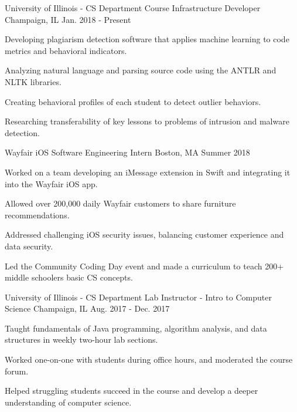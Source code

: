 
\begin{cventries}
\cventry
{University of Illinois - CS Department} %
{Course Infrastructure Developer} %
{Champaign, IL} %
{Jan. 2018 - Present} %
{
	\begin{cvitems} %
		\item {Developing plagiarism detection software that applies machine learning to code metrics and behavioral indicators.}
		\item {Analyzing natural language and parsing source code using the ANTLR and NLTK libraries.}
		\item {Creating behavioral profiles of each student to detect outlier behaviors.}
		\item {Researching transferability of key lessons to problems of intrusion and malware detection.}
	\end{cvitems}
}
\cventry
{Wayfair} %
{iOS Software Engineering Intern} %
{Boston, MA} %
{Summer 2018} %
{
	\begin{cvitems} %
		\item {Worked on a team developing an iMessage extension in Swift and integrating it into the Wayfair iOS app.}
		\item {Allowed over 200,000 daily Wayfair customers to share furniture recommendations.}
		\item {Addressed challenging iOS security issues, balancing customer experience and data security.}
		\item {Led the Community Coding Day event and made a curriculum to teach 200+ middle schoolers basic CS concepts.}
	\end{cvitems}
}
\cventry
{University of Illinois - CS Department} %
{Lab Instructor - Intro to Computer Science} %
{Champaign, IL} %
{Aug. 2017 - Dec. 2017} %
{
	\begin{cvitems} %
		\item {Taught fundamentals of Java programming, algorithm analysis, and data structures in weekly two-hour lab sections.}
		\item {Worked one-on-one with students during office hours, and moderated the course forum.}
		\item {Helped struggling students succeed in the course and develop a deeper understanding of computer science.}
	\end{cvitems}
}
\end{cventries}
